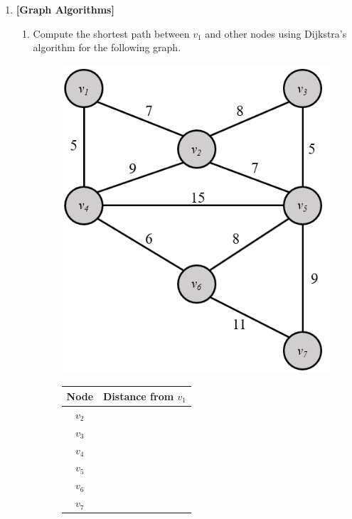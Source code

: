 \documentclass[11pt]{article}
\begin{document}
\begin{enumerate}

    \item \textbf{[Graph Algorithms]}
    \begin{enumerate}[label=(\alph*)]
        \item Compute the shortest path between $v_1$ and other nodes using Dijkstra's algorithm for the following graph. \\
        \begin{figure}[H]
        \centering
        \includegraphics[scale=0.7]{Images/Dijkstra.png}
        \endminipage\hfill
         \begin{tabular}{ | c | c | } 
         \hline
         \bf Node & \bf Distance from $v_1$\\
         \hline\hline
          $v_2$ & \\
         \hline
          $v_3$ & \\
         \hline
          $v_4$ & \\
         \hline
          $v_5$ & \\
         \hline
          $v_6$ & \\
         \hline
         $v_7$ & \\
         \hline
        \end{tabular}
        \endminipage
        \label{WIS}
        \end{figure}
        

\end{enumerate}
\end{enumerate}
\end{document}
